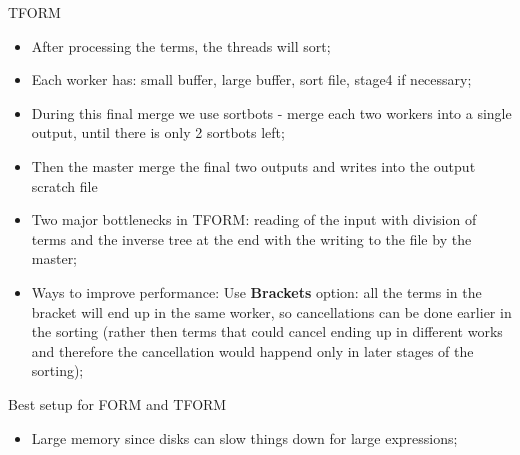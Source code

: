 \documentclass[11pt]{beamer}
\begin{document}
\begin{frame}{TFORM}
\begin{itemize}
\item After processing the terms, the threads will sort;
\item Each worker has: small buffer, large buffer, sort file, stage4 if necessary;
\item During this final merge we use sortbots -  merge each two workers into a single output, until there is only 2 sortbots left;
\item Then the master merge the final two outputs and writes into the output scratch file
\item Two major bottlenecks in TFORM: reading of the input with division of terms and the inverse tree at the end with the writing to the file by the master;
\item Ways to improve performance: Use \textbf{Brackets} option: all the terms in the bracket will end up in the same worker, so cancellations can be done earlier in the sorting (rather then terms that could cancel ending up in different works and therefore the cancellation would happend only in later stages of the sorting);
\end{itemize}
\end{frame}









\begin{frame}{Best setup for FORM and TFORM}
\begin{itemize}
\item Large memory since disks can slow things down for large expressions;
\end{itemize}
\end{frame}
\end{document}
